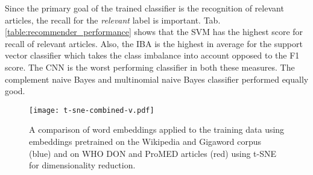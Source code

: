   Since the primary goal of the trained classifier is the recognition of relevant articles, the recall for the \emph{relevant} label is important. Tab. \ref{table:recommender_performance} shows that the SVM has the highest score for recall of relevant articles. Also, the IBA is the highest in average for the support vector classifier which takes the class imbalance into account opposed to the F1 score. The CNN is the worst performing classifier in both these measures. The complement naive Bayes and multinomial naive Bayes classifier performed equally good.

\begin{figure}
  \centering
  \texttt{[image: t-sne-combined-v.pdf]}
  \caption{A comparison of word embeddings applied to the training data using embeddings pretrained on the Wikipedia and Gigaword corpus (blue) and on WHO DON and ProMED articles (red) using t-SNE for dimensionality reduction.}
\label{fig:t-sne}
\end{figure}

